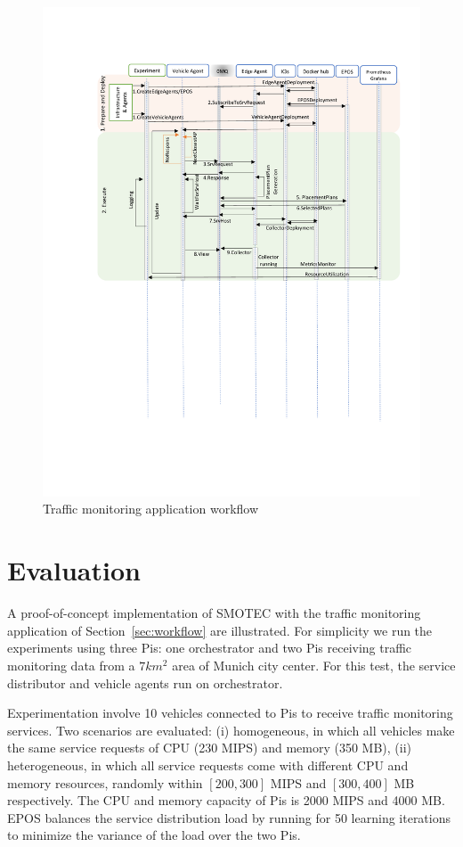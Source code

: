 \documentclass[conference]{IEEEtran}
\begin{document}
\begin{figure}[!htb]
\centering
\includegraphics[clip, trim=3cm 12.3cm 0.5cm 3.2cm, width=\columnwidth]{figures/workflow-2.pdf}
\caption{Traffic monitoring application workflow}
\label{fig:workflow}
\end{figure}


\section{Evaluation}\label{sec:evaluation}
\par A proof-of-concept implementation of SMOTEC with the traffic monitoring application of Section~\ref{sec:workflow} are illustrated. For simplicity we run the experiments using three Pis: one orchestrator and two Pis receiving traffic monitoring data from a $7{km^2}$ area of Munich city center. For this test, the service distributor and vehicle agents run on orchestrator. 

\par Experimentation involve 10 vehicles connected to Pis to receive traffic monitoring services. Two scenarios are evaluated: (i) homogeneous, in which all vehicles make the same service requests of CPU (230 MIPS) and memory (350 MB), (ii) heterogeneous, in which all service requests come with different CPU and memory resources, randomly within $[200,300]$ MIPS and $[300,400]$ MB respectively. The CPU and memory capacity of Pis is 2000 MIPS and 4000 MB. EPOS balances the service distribution load by running for 50 learning iterations to minimize the variance of the load over the two Pis.
\end{document}
